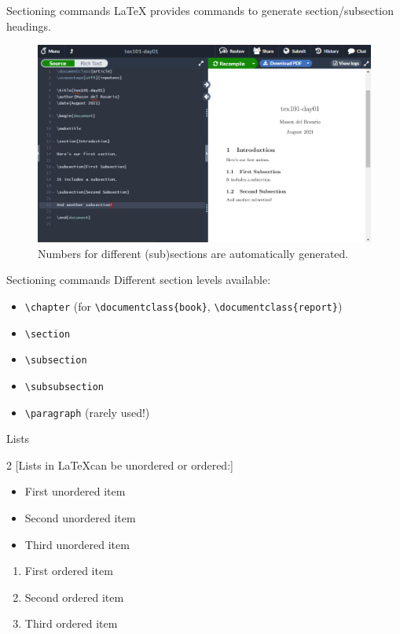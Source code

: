 \documentclass{beamer}
\begin{document}
{  \begin{frame}{Sectioning commands}
    \LaTeX\; provides commands to generate section/subsection headings. 
    \begin{figure}
      \includegraphics[width=0.9\linewidth]{day01-overleaf-05-sections.png}
      \caption{Numbers for different (sub)sections are automatically generated.}
      \label{fig:day01-overleaf-05-sections}
    \end{figure}
  \end{frame}

  \begin{frame}{Sectioning commands}
    Different section levels available:
    \begin{itemize}
      \item \texttt{\textbackslash chapter} (for \texttt{\textbackslash documentclass\{book\}}, \texttt{\textbackslash documentclass\{report\}})
      \item \texttt{\textbackslash section}
      \item \texttt{\textbackslash subsection}
      \item \texttt{\textbackslash subsubsection}
      \item \texttt{\textbackslash paragraph} (rarely used!)
    \end{itemize}
  \end{frame}

  \begin{frame}{Lists}
    \begin{multicols}{2}
    [\centering Lists in \LaTeX can be unordered or ordered:]
      \begin{itemize}
        \item First unordered item
        \item Second unordered item
        \item Third unordered item
      \end{itemize}
      \columnbreak
      \begin{enumerate}
        \item First ordered item
        \item Second ordered item
        \item Third ordered item
      \end{enumerate}
    \end{multicols}
  \end{frame}

}
\end{document}
